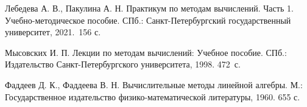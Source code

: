\documentclass[12pt]{article}
\begin{document}
    \renewcommand{\bibname}{{Список литературы}}
    
    \begin{thebibliography}{3}
        Лебедева А. В., Пакулина А. Н. Практикум по методам вычислений. Часть 1. Учебно-методическое пособие. СПб.: Санкт-Петербургский государственный университет, 2021.~156 с.

        Мысовских И. П. Лекции по методам вычислений: Учебное пособие. СПб.: Издательство Санкт-Петербургского университета, 1998. 472~с.
        
        Фаддеев Д. К., Фаддеева В. Н. Вычислительные методы линейной алгебры. М.:  Государственное издательство физико-математической литературы, 1960. 655 с.
        
    \end{thebibliography}
\end{document}
